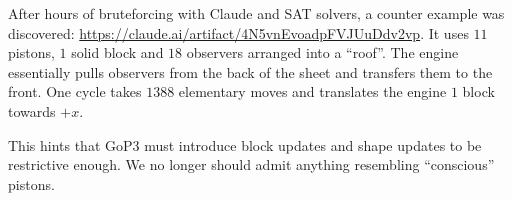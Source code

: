 \documentclass[12pt]{article}
\theoremstyle{remark}
\theoremstyle{definition}
\begin{document}
After hours of bruteforcing with Claude and SAT solvers, a counter example was discovered: \url{https://claude.ai/artifact/4N5vnEvoadpFVJUuDdv2vp}. It uses $11$ pistons, $1$ solid block and $18$ observers arranged into a ``roof''. The engine essentially pulls observers from the back of the sheet and transfers them to the front. One cycle takes $1388$ elementary moves and translates the engine $1$ block towards $+x$.

This hints that GoP3 must introduce block updates and shape updates to be restrictive enough. We no longer should admit anything resembling ``conscious'' pistons.
\end{document}
